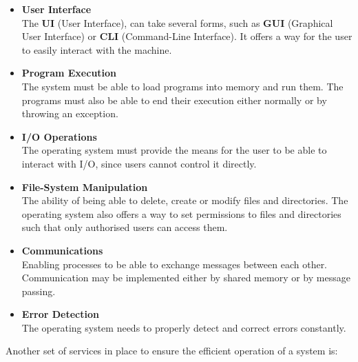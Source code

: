 \documentclass{article}
\begin{document}
\begin{itemize}
	\item \textbf{User Interface}
	\vspace{.2cm} \\
	The \textbf{UI} (User Interface), can take several forms, such as \textbf{GUI} (Graphical User Interface) or \textbf{CLI} (Command-Line Interface). It offers a way for the user to easily interact with the machine.
	
	\item \textbf{Program Execution}
	\vspace{.2cm} \\
	The system must be able to load programs into memory and run them. The programs must also be able to end their execution either normally or by throwing an exception.
	
	\item \textbf{I/O Operations}
	\vspace{.2cm} \\
	The operating system must provide the means for the user to be able to interact with I/O, since users cannot control it directly.
	
	\item \textbf{File-System Manipulation}
	\vspace{.2cm} \\
	The ability of being able to delete, create or modify files and directories. The operating system also offers a way to set permissions to files and directories such that only authorised users can access them.
	
	\item \textbf{Communications}
	\vspace{.2cm} \\
	Enabling processes to be able to exchange messages between each other. Communication may be implemented either by shared memory or by message passing.
	
	\item \textbf{Error Detection}
	\vspace{.2cm} \\
	The operating system needs to properly detect and correct errors constantly.
\end{itemize}
Another set of services in place to ensure the efficient operation of a system is:
\end{document}
